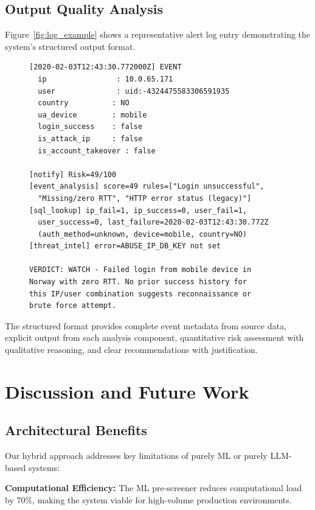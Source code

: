 \documentclass[11pt,twocolumn]{article}
\begin{document}
\subsection{Output Quality Analysis}

Figure~\ref{fig:log_example} shows a representative alert log entry demonstrating the system's structured output format.

\begin{figure}[h]
\centering
\begin{lstlisting}[caption={Example Alert Log Entry},label={fig:log_example},basicstyle=\tiny\ttfamily]
[2020-02-03T12:43:30.772000Z] EVENT
  ip                : 10.0.65.171
  user              : uid:-4324475583306591935
  country          : NO
  ua_device        : mobile
  login_success    : false
  is_attack_ip     : false
  is_account_takeover : false

[notify] Risk=49/100
[event_analysis] score=49 rules=["Login unsuccessful", 
  "Missing/zero RTT", "HTTP error status (legacy)"]
[sql_lookup] ip_fail=1, ip_success=0, user_fail=1, 
  user_success=0, last_failure=2020-02-03T12:43:30.772Z 
  (auth_method=unknown, device=mobile, country=NO)
[threat_intel] error=ABUSE_IP_DB_KEY not set

VERDICT: WATCH - Failed login from mobile device in 
Norway with zero RTT. No prior success history for 
this IP/user combination suggests reconnaissance or 
brute force attempt.
\end{lstlisting}
\end{figure}

The structured format provides complete event metadata from source data, explicit output from each analysis component, quantitative risk assessment with qualitative reasoning, and clear recommendations with justification.

\section{Discussion and Future Work}

\subsection{Architectural Benefits}

Our hybrid approach addresses key limitations of purely ML or purely LLM-based systems:

\textbf{Computational Efficiency:} The ML pre-screener reduces computational load by 70\%, making the system viable for high-volume production environments.
\end{document}

